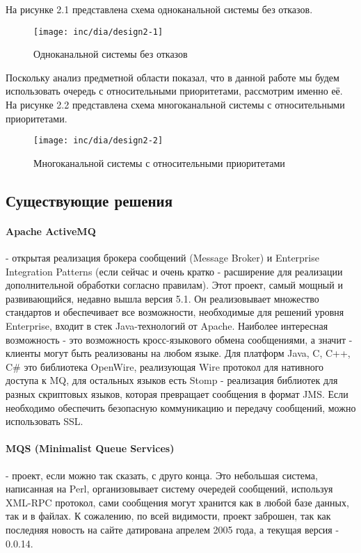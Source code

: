 На рисунке 2.1 представлена схема одноканальной системы без отказов.
\begin{figure}
  \centering
  \texttt{[image: inc/dia/design2-1]}
  \caption{Одноканальной системы без отказов}
  \label{fig:fig01}
\end{figure}

Поскольку анализ предметной области показал, что в данной работе мы будем использовать очередь с относительными приоритетами, рассмотрим именно её.
На рисунке 2.2 представлена схема многоканальной системы с относительными приоритетами.
\begin{figure}
  \centering
  \texttt{[image: inc/dia/design2-2]}
  \caption{Многоканальной системы с относительными приоритетами}
  \label{fig:fig02}
\end{figure}

\subsection{Существующие решения} 

\paragraph{Apache ActiveMQ} - открытая реализация брокера сообщений (Message Broker) и Enterprise Integration Patterns (если сейчас и очень кратко - расширение для реализации дополнительной обработки согласно правилам). Этот проект, самый мощный и развивающийся, недавно вышла версия 5.1. Он реализовывает множество стандартов и обеспечивает все возможности, необходимые для решений уровня Enterprise, входит в стек Java-технологий от Apache. Наиболее интересная возможность - это возможность кросс-языкового обмена сообщениями, а значит - клиенты могут быть реализованы на любом языке. Для платформ Java, C, C++, C\# это библиотека OpenWire, реализующая Wire протокол для нативного доступа к MQ, для остальных языков есть Stomp - реализация библиотек для разных скриптовых языков, которая превращает сообщения в формат JMS. Если необходимо обеспечить безопасную коммуникацию и передачу сообщений, можно использовать SSL.

\paragraph{MQS (Minimalist Queue Services)} - проект, если можно так сказать, с друго конца. Это небольшая система, написанная на Perl, организовывает систему очередей сообщений, используя XML-RPC протокол, сами сообщения могут хранится как в любой базе данных, так и в файлах. К сожалению, по всей видимости, проект заброшен, так как последняя новость на сайте датирована апрелем 2005 года, а текущая версия - 0.0.14.

